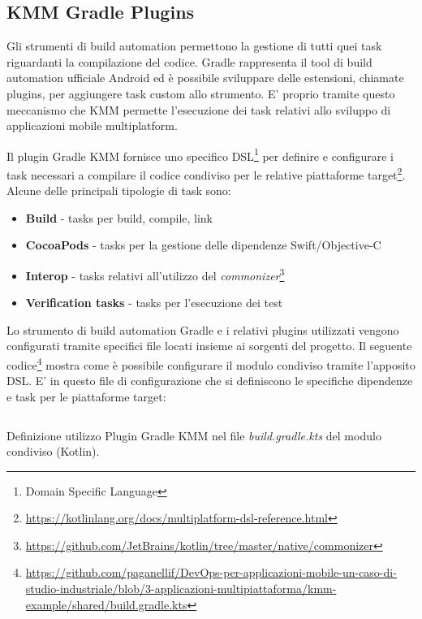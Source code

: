 \subsection{KMM Gradle Plugins}
Gli strumenti di build automation permettono la gestione di tutti quei task riguardanti la compilazione del codice. Gradle rappresenta il tool di build automation ufficiale Android ed è possibile sviluppare delle estensioni, chiamate plugins, per aggiungere task custom allo strumento. E' proprio tramite questo meccanismo che KMM permette l'esecuzione dei task relativi allo sviluppo di applicazioni mobile multiplatform.

Il plugin Gradle KMM fornisce uno specifico DSL\footnote{Domain Specific Language} per definire e configurare i task necessari a compilare il codice condiviso per le relative piattaforme target\footnote{\href{https://kotlinlang.org/docs/multiplatform-dsl-reference.html}{https://kotlinlang.org/docs/multiplatform-dsl-reference.html}}. Alcune delle principali tipologie di task sono:

\begin{itemize}
    \item \textbf{Build} - tasks per build, compile, link
    \item \textbf{CocoaPods} - tasks per la gestione delle dipendenze Swift/Objective-C
    \item \textbf{Interop} - tasks relativi all'utilizzo del \textit{commonizer}\footnote{\href{https://github.com/JetBrains/kotlin/tree/master/native/commonizer}{https://github.com/JetBrains/kotlin/tree/master/native/commonizer}}
    \item \textbf{Verification tasks} - tasks per l'esecuzione dei test
\end{itemize}

Lo strumento di build automation Gradle e i relativi plugins utilizzati vengono configurati tramite specifici file locati insieme ai sorgenti del progetto. Il seguente codice\footnote{\href{https://github.com/paganellif/DevOps-per-applicazioni-mobile-un-caso-di-studio-industriale/blob/3-applicazioni-multipiattaforma/kmm-example/shared/build.gradle.kts}{https://github.com/paganellif/DevOps-per-applicazioni-mobile-un-caso-di-studio-industriale/blob/3-applicazioni-multipiattaforma/kmm-example/shared/build.gradle.kts}} mostra come è possibile configurare il modulo condiviso tramite l'apposito DSL. E' in questo file di configurazione che si definiscono le specifiche dipendenze e task per le piattaforme target:

\begin{listing}[H]
\inputminted{kotlin}{code/3-gradlekmm2}
\caption{Definizione utilizzo Plugin Gradle KMM nel file \textit{build.gradle.kts} del modulo condiviso (Kotlin).}
\end{listing}

